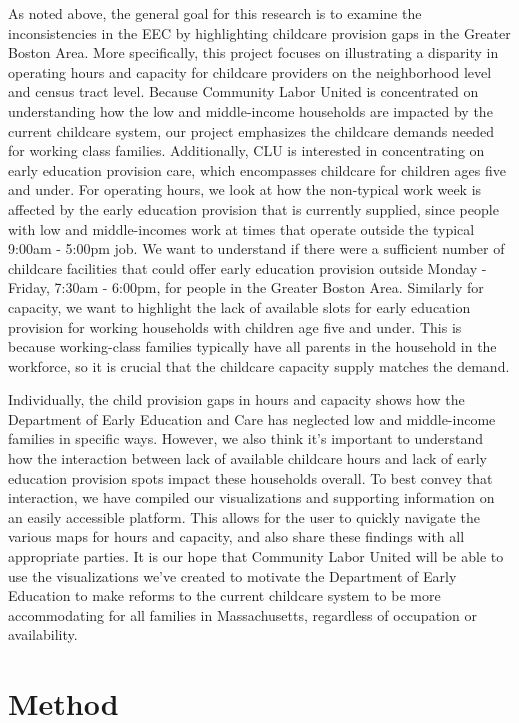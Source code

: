 \documentclass[10pt,letterpaper]{article}
\begin{document}
As noted above, the general goal for this research is to examine the
inconsistencies in the EEC by highlighting childcare provision gaps in
the Greater Boston Area. More specifically, this project focuses on
illustrating a disparity in operating hours and capacity for childcare
providers on the neighborhood level and census tract level. Because
Community Labor United is concentrated on understanding how the low and
middle-income households are impacted by the current childcare system,
our project emphasizes the childcare demands needed for working class
families. Additionally, CLU is interested in concentrating on early
education provision care, which encompasses childcare for children ages
five and under. For operating hours, we look at how the non-typical work
week is affected by the early education provision that is currently
supplied, since people with low and middle-incomes work at times that
operate outside the typical 9:00am - 5:00pm job. We want to understand
if there were a sufficient number of childcare facilities that could
offer early education provision outside Monday - Friday, 7:30am -
6:00pm, for people in the Greater Boston Area. Similarly for capacity,
we want to highlight the lack of available slots for early education
provision for working households with children age five and under. This
is because working-class families typically have all parents in the
household in the workforce, so it is crucial that the childcare capacity
supply matches the demand.

Individually, the child provision gaps in hours and capacity shows how
the Department of Early Education and Care has neglected low and
middle-income families in specific ways. However, we also think it's
important to understand how the interaction between lack of available
childcare hours and lack of early education provision spots impact these
households overall. To best convey that interaction, we have compiled
our visualizations and supporting information on an easily accessible
platform. This allows for the user to quickly navigate the various maps
for hours and capacity, and also share these findings with all
appropriate parties. It is our hope that Community Labor United will be
able to use the visualizations we've created to motivate the Department
of Early Education to make reforms to the current childcare system to be
more accommodating for all families in Massachusetts, regardless of
occupation or availability.

\section{Method}\label{method}
\end{document}

